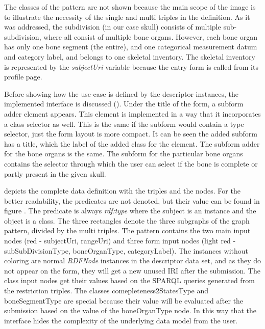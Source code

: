 
The classes of the pattern are not shown because the main scope of the image is to illustrate the necessity of the single and multi triples in the definition. As it was addressed, the subdivision (in our case skull) consists of multiple sub-subdivision, where all consist of multiple bone organs. However, each bone organ has only one bone segment (the entire), and one categorical measurement datum and category label, and belongs to one skeletal inventory. The skeletal inventory is represented by the \textit{subjectUri} variable because the entry form is called from its profile page.

Before showing how the use-case is defined by the descriptor instances, the implemented interface is discussed (). Under the title of the form, a subform adder element appears. This element is implemented in a way that it incorporates a class selector as well. This is the same if the subform would contain a type selector, just the form layout is more compact. It can be seen the added subform has a title, which the label of the added class for the element. The subform adder for the bone organs is the same. The subform for the particular bone organs contains the selector through which the user can select if the bone is complete or partly present in the given skull.


 depicts the complete data definition with the triples and the nodes. For the better readability, the predicates are not denoted, but their value can be found in figure . The predicate is always \textit{rdf:type} where the subject is an instance and the object is a class. The three rectangles denote the three subgraphs of the graph pattern, divided by the multi triples. The pattern contains the two main input nodes (red - subjectUri, rangeUri) and three form input nodes (light red - subSubDivisionType, boneOrganType, categoryLabel). The instances without coloring are normal \textit{RDFNode} instances in the descriptor data set, and as they do not appear on the form, they will get a new unused IRI after the submission. The class input nodes get their values based on the SPARQL queries generated from the restriction triples. The classes comepleteness2StatesType and boneSegmentType are special because their value will be evaluated after the submission based on the value of the boneOrganType node. In this way that the interface hides the complexity of the underlying data model from the user.

